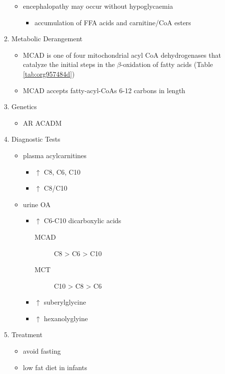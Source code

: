 \documentclass[12pt]{scrartcl}
\begin{document}
\begin{enumerate}
\begin{itemize}
\item encephalopathy may occur without hypoglycaemia
\begin{itemize}
\item accumulation of FFA acids and carnitine/CoA esters
\end{itemize}
\end{itemize}
\item Metabolic Derangement
\label{sec:orgdb88be1}
\begin{itemize}
\item MCAD is one of four mitochondrial acyl CoA dehydrogenases that
catalyze the initial steps in the \(\beta\)-oxidation of fatty acids
(Table \ref{tab:org957484d})
\item MCAD accepts fatty-acyl-CoAs 6-12 carbons in length
\end{itemize}

\item Genetics
\label{sec:org92c5077}
\begin{itemize}
\item AR ACADM
\end{itemize}
\item Diagnostic Tests
\label{sec:org1c3e036}
\begin{itemize}
\item plasma acylcarnitines
\begin{itemize}
\item \(\uparrow\) C8, C6, C10
\item \(\uparrow\) C8/C10
\end{itemize}
\item urine OA
\begin{itemize}
\item \(\uparrow\) C6-C10 dicarboxylic acids
\begin{description}
\item[{MCAD}] C8 > C6 > C10
\item[{MCT}] C10 > C8 > C6
\end{description}
\item \(\uparrow\) suberylglycine
\item \(\uparrow\) hexanolyglyine
\end{itemize}
\end{itemize}

\item Treatment
\label{sec:orga0d1b5c}
\begin{itemize}
\item avoid fasting
\item low fat diet in infants
\end{itemize}
\end{enumerate}
\end{document}
